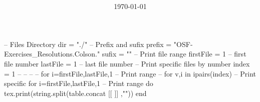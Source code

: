 \documentclass[
  class=article,
  multi={minipage},
  border={3mm},
]{standalone}
\title{\huge\bfseries\color{Emph}\mytitle}
\author{\Large\myauthor}
\date{\Large\today}
\begin{document}
\mymaketitle
\begin{luacode*}
  -- Files Directory
  dir = "./"
  -- Prefix and sufix
  prefix = "OSF-Exercises_Resolutions.Colson."
  sufix  = ""
  -- Print file range
  firstFile = 1 -- first file number
  lastFile  = 1 -- last  file number
  -- Print specific files by number
  index = {1}
  -- %
  -- %
  -- %
  -- for i=firstFile,lastFile,1 -- Print range
  -- for v,i in ipairs(index)   -- Print specific
  for i=firstFile,lastFile,1 -- Print range
  do
    tex.print(string.split(table.concat{
    [[
      \newpage
    ]]
    },"\n"))
  end
\end{luacode*}
\end{document}
